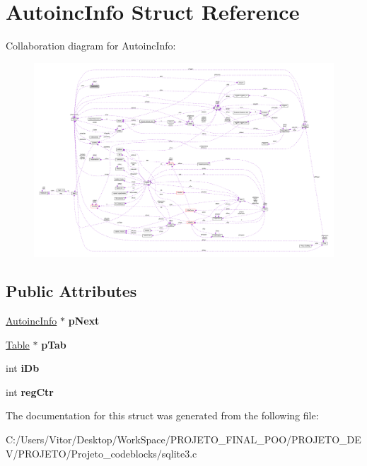 \hypertarget{struct_autoinc_info}{\section{Autoinc\-Info Struct Reference}
\label{struct_autoinc_info}
}


Collaboration diagram for Autoinc\-Info\-:\nopagebreak
\begin{figure}[H]
\begin{center}
\leavevmode
\includegraphics[width=350pt]{struct_autoinc_info__coll__graph}
\end{center}
\end{figure}
\subsection*{Public Attributes}
\begin{DoxyCompactItemize}
\item 
\hypertarget{struct_autoinc_info_aa77fb076beea013c25df4e49dba4b6f6}{\hyperlink{struct_autoinc_info}{Autoinc\-Info} $\ast$ {\bfseries p\-Next}}\label{struct_autoinc_info_aa77fb076beea013c25df4e49dba4b6f6}

\item 
\hypertarget{struct_autoinc_info_a0cf785b0cbaddb4215a8408f8e13075e}{\hyperlink{struct_table}{Table} $\ast$ {\bfseries p\-Tab}}\label{struct_autoinc_info_a0cf785b0cbaddb4215a8408f8e13075e}

\item 
\hypertarget{struct_autoinc_info_ae7234e0916b11ef97377bdfd6c7c4568}{int {\bfseries i\-Db}}\label{struct_autoinc_info_ae7234e0916b11ef97377bdfd6c7c4568}

\item 
\hypertarget{struct_autoinc_info_af180977ee7dcc8cab862185692f57cc5}{int {\bfseries reg\-Ctr}}\label{struct_autoinc_info_af180977ee7dcc8cab862185692f57cc5}

\end{DoxyCompactItemize}


The documentation for this struct was generated from the following file\-:\begin{DoxyCompactItemize}
\item 
C\-:/\-Users/\-Vitor/\-Desktop/\-Work\-Space/\-P\-R\-O\-J\-E\-T\-O\-\_\-\-F\-I\-N\-A\-L\-\_\-\-P\-O\-O/\-P\-R\-O\-J\-E\-T\-O\-\_\-\-D\-E\-V/\-P\-R\-O\-J\-E\-T\-O/\-Projeto\-\_\-codeblocks/sqlite3.\-c\end{DoxyCompactItemize}
